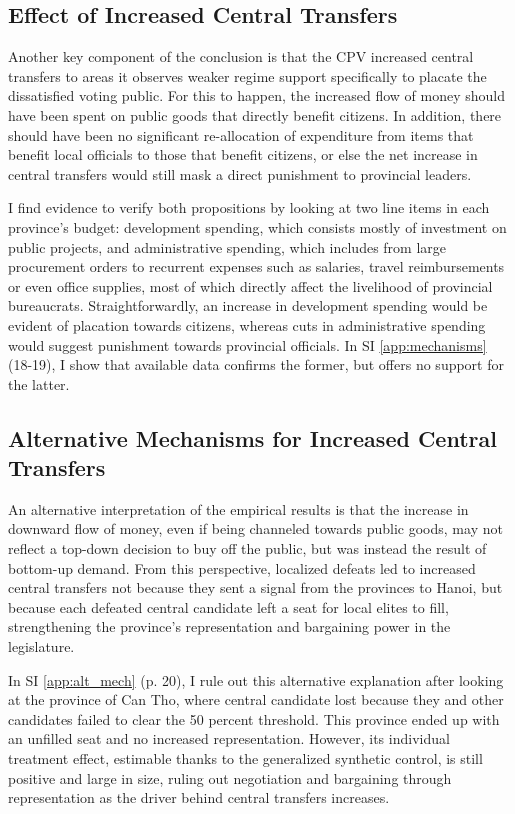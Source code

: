 \documentclass[12pt]{article}
\newcommand{\1}{\mathbbm{1}}
\begin{document}
\subsection{Effect of Increased Central Transfers}

Another key component of the conclusion is that the CPV increased central transfers to areas it observes weaker regime support specifically to placate the dissatisfied voting public. For this to happen, the increased flow of money should have been spent on public goods that directly benefit citizens. In addition, there should have been no significant re-allocation of expenditure from items that benefit local officials to those that benefit citizens, or else the net increase in central transfers would still mask a direct punishment to provincial leaders. 

I find evidence to verify both propositions by looking at two line items in each province's budget: development spending, which consists mostly of investment on public projects, and administrative spending, which includes from large procurement orders to recurrent expenses such as salaries, travel reimbursements or even office supplies, most of which directly affect the livelihood of provincial bureaucrats. Straightforwardly, an increase in development spending would be evident of placation towards citizens, whereas cuts in administrative spending would suggest punishment towards provincial officials. In SI \ref{app:mechanisms} (18-19), I show that available data confirms the former, but offers no support for the latter.

\subsection{Alternative Mechanisms for Increased Central Transfers}

An alternative interpretation of the empirical results is that the increase in downward flow of money, even if being channeled towards public goods, may not reflect a top-down decision to buy off the public, but was instead the result of bottom-up demand. From this perspective, localized defeats led to increased central transfers not because they sent a signal from the provinces to Hanoi, but because each defeated central candidate left a seat for local elites to fill, strengthening the province's representation and bargaining power in the legislature.

In SI \ref{app:alt_mech} (p. 20), I rule out this alternative explanation after looking at the province of Can Tho, where central candidate lost because they and other candidates failed to clear the 50 percent threshold. This province ended up with an unfilled seat and no increased representation. However, its individual treatment effect, estimable thanks to the generalized synthetic control, is still positive and large in size, ruling out negotiation and bargaining through representation as the driver behind central transfers increases.
\end{document}
